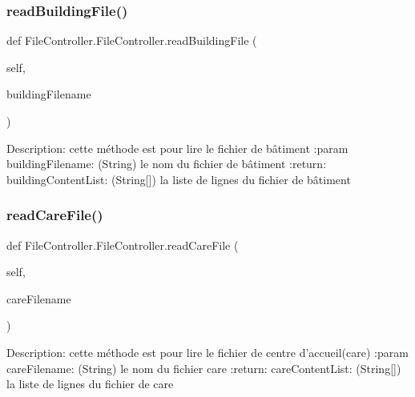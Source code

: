 \subsubsection{\texorpdfstring{read\+Building\+File()}{readBuildingFile()}}
{\footnotesize\ttfamily def File\+Controller.\+File\+Controller.\+read\+Building\+File (\begin{DoxyParamCaption}\item[{}]{self,  }\item[{}]{building\+Filename }\end{DoxyParamCaption})}

\begin{DoxyVerb}Description: cette méthode est pour lire le fichier de bâtiment
:param buildingFilename: (String) le nom du fichier de bâtiment
:return: buildingContentList: (String[]) la liste de lignes du fichier de bâtiment
\end{DoxyVerb}
 \mbox{\label{class_file_controller_1_1_file_controller_a29b92a4d19263d13732a9edf7d218602}} 
\subsubsection{\texorpdfstring{read\+Care\+File()}{readCareFile()}}
{\footnotesize\ttfamily def File\+Controller.\+File\+Controller.\+read\+Care\+File (\begin{DoxyParamCaption}\item[{}]{self,  }\item[{}]{care\+Filename }\end{DoxyParamCaption})}

\begin{DoxyVerb}Description: cette méthode est pour lire le fichier de centre d'accueil(care)
:param careFilename: (String) le nom du fichier care
:return: careContentList: (String[]) la liste de lignes du fichier de care
\end{DoxyVerb}
 \mbox{\label{class_file_controller_1_1_file_controller_a77fe65432e567dc86472b95759db1ee7}} 
